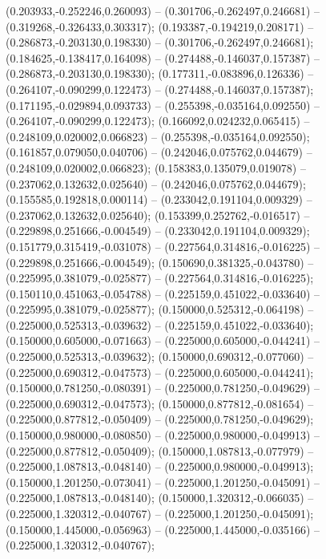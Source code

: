  (0.203933,-0.252246,0.260093) -- (0.301706,-0.262497,0.246681) -- (0.319268,-0.326433,0.303317);
 (0.193387,-0.194219,0.208171) -- (0.286873,-0.203130,0.198330) -- (0.301706,-0.262497,0.246681);
 (0.184625,-0.138417,0.164098) -- (0.274488,-0.146037,0.157387) -- (0.286873,-0.203130,0.198330);
 (0.177311,-0.083896,0.126336) -- (0.264107,-0.090299,0.122473) -- (0.274488,-0.146037,0.157387);
 (0.171195,-0.029894,0.093733) -- (0.255398,-0.035164,0.092550) -- (0.264107,-0.090299,0.122473);
 (0.166092,0.024232,0.065415) -- (0.248109,0.020002,0.066823) -- (0.255398,-0.035164,0.092550);
 (0.161857,0.079050,0.040706) -- (0.242046,0.075762,0.044679) -- (0.248109,0.020002,0.066823);
 (0.158383,0.135079,0.019078) -- (0.237062,0.132632,0.025640) -- (0.242046,0.075762,0.044679);
 (0.155585,0.192818,0.000114) -- (0.233042,0.191104,0.009329) -- (0.237062,0.132632,0.025640);
 (0.153399,0.252762,-0.016517) -- (0.229898,0.251666,-0.004549) -- (0.233042,0.191104,0.009329);
 (0.151779,0.315419,-0.031078) -- (0.227564,0.314816,-0.016225) -- (0.229898,0.251666,-0.004549);
 (0.150690,0.381325,-0.043780) -- (0.225995,0.381079,-0.025877) -- (0.227564,0.314816,-0.016225);
 (0.150110,0.451063,-0.054788) -- (0.225159,0.451022,-0.033640) -- (0.225995,0.381079,-0.025877);
 (0.150000,0.525312,-0.064198) -- (0.225000,0.525313,-0.039632) -- (0.225159,0.451022,-0.033640);
 (0.150000,0.605000,-0.071663) -- (0.225000,0.605000,-0.044241) -- (0.225000,0.525313,-0.039632);
 (0.150000,0.690312,-0.077060) -- (0.225000,0.690312,-0.047573) -- (0.225000,0.605000,-0.044241);
 (0.150000,0.781250,-0.080391) -- (0.225000,0.781250,-0.049629) -- (0.225000,0.690312,-0.047573);
 (0.150000,0.877812,-0.081654) -- (0.225000,0.877812,-0.050409) -- (0.225000,0.781250,-0.049629);
 (0.150000,0.980000,-0.080850) -- (0.225000,0.980000,-0.049913) -- (0.225000,0.877812,-0.050409);
 (0.150000,1.087813,-0.077979) -- (0.225000,1.087813,-0.048140) -- (0.225000,0.980000,-0.049913);
 (0.150000,1.201250,-0.073041) -- (0.225000,1.201250,-0.045091) -- (0.225000,1.087813,-0.048140);
 (0.150000,1.320312,-0.066035) -- (0.225000,1.320312,-0.040767) -- (0.225000,1.201250,-0.045091);
 (0.150000,1.445000,-0.056963) -- (0.225000,1.445000,-0.035166) -- (0.225000,1.320312,-0.040767);
